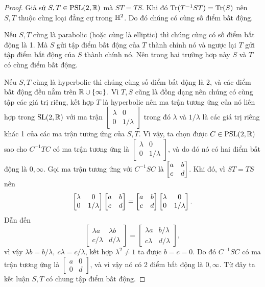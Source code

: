\begin{proof}
    Giả sử $S, T \in \operatorname{PSL}(2,\mathbb{R})$ mà $ST = TS$. Khi đó $\operatorname{Tr}(T^{-1}ST) = \operatorname{Tr}(S)$ nên $S,T$ thuộc cùng loại đẳng cự trong $\mathbb{H}^2$. Do đó chúng có cùng số điểm bất động. 
    
    Nếu $S, T$ cùng là parabolic (hoặc cùng là elliptic) thì chúng cùng có số điểm bất động là 1. Mà $S$ gửi tập điểm bất động của $T$ thành chính nó và ngược lại $T$ gửi tập điểm bất động của $S$ thành chính nó. Nên trong hai trường hơp này $S$ và $T$ có cùng điểm bất động.

    Nếu $S,T$ cùng là hyperbolic thì chúng cùng số điểm bất động là 2, và các điểm bất động đều nằm trên $\mathbb{R} \cup \{\infty\}$. Vì $T,S$ cũng là đồng dạng nên chúng có cùng tập các giá trị riêng, kết hợp $T$ là hyperbolic nên ma trận tương ứng của nó liên hợp trong $\operatorname{SL}(2,\mathbb{R})$ với ma trận $\begin{bmatrix}
        \lambda & 0\\
        0 & 1/\lambda
    \end{bmatrix}$ trong đó $\lambda$ và $1/\lambda$ là các giá trị riêng khác 1 của các ma trận tương ứng của $S,T$. Vì vậy, ta chọn được $C \in \operatorname{PSL}(2,\mathbb{R})$ sao cho $C^{-1}TC$ có ma trận tương ứng là  $\begin{bmatrix}
        \lambda & 0\\
        0 & 1/\lambda
    \end{bmatrix}$, và do đó nó có hai điểm bất động là $0, \infty$. Gọi ma trận tương ứng với $C^{-1}SC$ là $\begin{bmatrix} a & b \\ c & d \\ \end{bmatrix}$. Khi đó, vì $ST = TS$ nên
    \[\begin{bmatrix}
        \lambda & 0\\
        0 & 1/\lambda
    \end{bmatrix}\begin{bmatrix} a & b \\ c & d \\ \end{bmatrix} = \begin{bmatrix} a & b \\ c & d \\ \end{bmatrix} \begin{bmatrix}
        \lambda & 0\\
        0 & 1/\lambda
    \end{bmatrix}.\]
    Dẫn đến \[\begin{bmatrix}
        \lambda a& \lambda b\\
        c/\lambda  & d/\lambda
    \end{bmatrix} = \begin{bmatrix}
        \lambda a& b/\lambda\\
        c\lambda  & d/\lambda
    \end{bmatrix},\]
    vì vậy $\lambda b = b/\lambda,~c\lambda = c/\lambda$, kết hợp $\lambda^ 2 \neq 1$ ta được $b = c =0$. Do đó $C^{-1}SC$ có ma trận tương ứng là $\begin{bmatrix}
        a&  0\\
        0 & d
    \end{bmatrix}$, và vì vậy nó có 2 điểm bất động là $0, \infty$. Từ đây ta kết luận $S, T$ có chung tập điểm bất động.


\end{proof}
